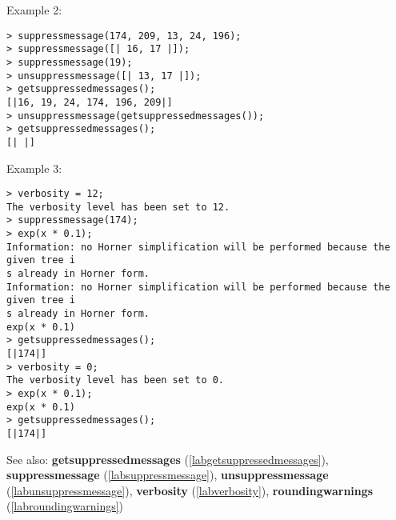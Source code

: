 \noindent Example 2: 
\begin{center}\begin{minipage}{15cm}\begin{Verbatim}[frame=single]
> suppressmessage(174, 209, 13, 24, 196);
> suppressmessage([| 16, 17 |]);
> suppressmessage(19);
> unsuppressmessage([| 13, 17 |]);
> getsuppressedmessages();
[|16, 19, 24, 174, 196, 209|]
> unsuppressmessage(getsuppressedmessages());
> getsuppressedmessages();
[| |]
\end{Verbatim}
\end{minipage}\end{center}
\noindent Example 3: 
\begin{center}\begin{minipage}{15cm}\begin{Verbatim}[frame=single]
> verbosity = 12;
The verbosity level has been set to 12.
> suppressmessage(174);
> exp(x * 0.1);
Information: no Horner simplification will be performed because the given tree i
s already in Horner form.
Information: no Horner simplification will be performed because the given tree i
s already in Horner form.
exp(x * 0.1)
> getsuppressedmessages();
[|174|]
> verbosity = 0;
The verbosity level has been set to 0.
> exp(x * 0.1);
exp(x * 0.1)
> getsuppressedmessages();
[|174|]
\end{Verbatim}
\end{minipage}\end{center}
See also: \textbf{getsuppressedmessages} (\ref{labgetsuppressedmessages}), \textbf{suppressmessage} (\ref{labsuppressmessage}), \textbf{unsuppressmessage} (\ref{labunsuppressmessage}), \textbf{verbosity} (\ref{labverbosity}), \textbf{roundingwarnings} (\ref{labroundingwarnings})
